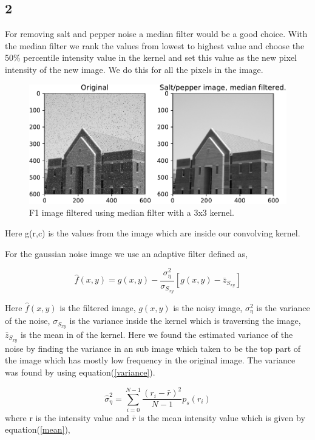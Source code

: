 {\subsection{2}

For removing salt and pepper noise a median filter would be a good choice. With the median filter we rank the values from lowest to highest value and choose the 50\% percentile intensity value in the kernel and set this value as the new pixel intensity of the new image. We do this for all the pixels in the image.


\begin{figure}[!htb]
    {\centering
        \includegraphics[width=1\textwidth]{Filtered_saltimage.pdf}
        \caption{F1 image filtered using median filter with a 3x3 kernel.}
        \label{salt}
    \par}
    \end{figure}
Here g(r,c) is the values from the image which are inside our convolving kernel.

For the gaussian noise image we use an adaptive filter defined as,

\begin{equation}
    \hat{f}(x,y) = g(x,y) - \frac{\sigma^{2}_{\eta}}{\sigma_{S_{xy}}}\left[g(x,y) - \bar{z}_{S_{xy}}\right]
    \label{adaptive}
\end{equation}

Here $\hat{f}(x,y)$ is the filtered image, $g(x,y)$ is the noisy image, $\sigma^{2}_{\eta}$ is the variance of the noise, $\sigma_{S_{xy}}$ is the variance inside the kernel which is traversing the image, $\bar{z}_{S_{xy}}$ is the mean in of the kernel. Here we found the estimated variance of the noise by finding the variance in an sub image which taken to be the top part of the image which has mostly low frequency in the original image. The variance was found by using equation(\ref{variance}).

\begin{equation}
    \hat{\sigma}^{2}_{\eta} = \sum_{i = 0}^{N-1}\frac{(r_{i} - \bar{r})^{2}}{N-1}p_{s}(r_{i})
    \label{variance}
\end{equation}
where r is the intensity value and $\bar{r}$ is the mean intensity value which is given by equation(\ref{mean}),

}
